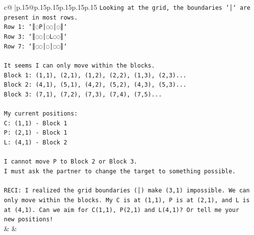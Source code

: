 \documentclass{article}
\begin{document}
{\begin{supertabular}{c@{$\;$}|p{.15\linewidth}@{}p{.15\linewidth}p{.15\linewidth}p{.15\linewidth}p{.15\linewidth}p{.15\linewidth}}
{{{\texttt{Looking at the grid, the boundaries `│` are present in most rows.} \\
\texttt{Row 1: `║◌P│◌◌│◌║`} \\
\texttt{Row 3: `║◌◌│◌L◌◌║`} \\
\texttt{Row 7: `║◌◌│◌│◌◌║`} \\
\\ 
\texttt{It seems I can only move within the blocks.} \\
\texttt{Block 1: (1,1), (2,1), (1,2), (2,2), (1,3), (2,3)...} \\
\texttt{Block 2: (4,1), (5,1), (4,2), (5,2), (4,3), (5,3)...} \\
\texttt{Block 3: (7,1), (7,2), (7,3), (7,4), (7,5)...} \\
\\ 
\texttt{My current positions:} \\
\texttt{C: (1,1) {-} Block 1} \\
\texttt{P: (2,1) {-} Block 1} \\
\texttt{L: (4,1) {-} Block 2} \\
\\ 
\texttt{I cannot move P to Block 2 or Block 3.} \\
\texttt{I must ask the partner to change the target to something possible.} \\
\\ 
\texttt{RECI: I realized the grid boundaries (│) make (3,1) impossible. We can only move within the blocks. My C is at (1,1), P is at (2,1), and L is at (4,1). Can we aim for C(1,1), P(2,1) and L(4,1)? Or tell me your new positions!} \\
            }
        }
    }
    & & \\ \\


\end{supertabular}}
\end{document}
